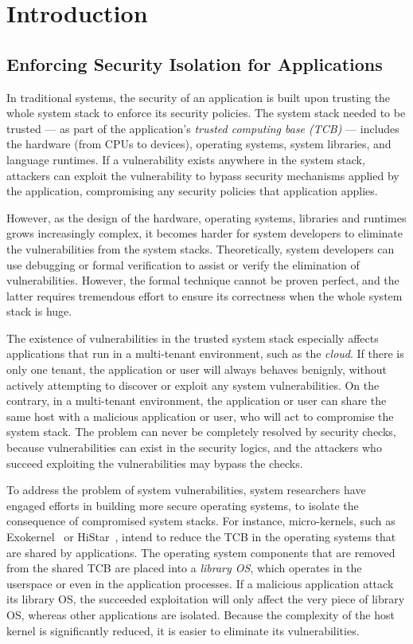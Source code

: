 \chapter{Introduction}
\label{chap:intro}

\section{Enforcing Security Isolation for Applications}
\label{sec:intro:isolation}

In traditional systems, the security of an application is built upon
trusting the whole system stack to enforce its security policies.
The system stack needed to be trusted
--- as part of the application's {\em trusted computing base (TCB)}
--- includes the hardware (from CPUs to devices), operating systems, system libraries, and language runtimes.
If a vulnerability exists anywhere in the system stack,
attackers can exploit the vulnerability to bypass security mechanisms applied by the application,
compromising any security policies that application applies.

However, as the design of the hardware, operating systems, libraries and runtimes grows increasingly complex,
it becomes harder for system developers to eliminate the vulnerabilities
from the system stacks.
Theoretically, system developers can use debugging or formal verification
to assist or verify the elimination of vulnerabilities.
However, the formal technique cannot be proven perfect, and the latter requires tremendous effort to ensure its correctness
when the whole system stack is huge.

The existence of vulnerabilities in the trusted system stack especially affects applications that run in a multi-tenant environment, such as the {\em cloud}.
If there is only one tenant,
the application or user will always behaves benignly,
without actively attempting to discover or exploit any system vulnerabilities.
On the contrary, in a multi-tenant environment,
the application or user can share the same host with a malicious application or user,
who will act to compromise the system stack.
The problem can never be completely resolved by security checks,
because vulnerabilities can exist in the security logics,
and the attackers who succeed exploiting the vulnerabilities may bypass the checks.

To address the problem of system vulnerabilities, system researchers have engaged efforts in building more secure operating systems,
to isolate the consequence of compromised system stacks.
For instance,
micro-kernels, such as Exokernel~\citep{engler95exokernel} or HiStar~\citep{zeldovich+histar},
intend to reduce the TCB in the operating systems that are shared by applications.
The operating system components that are removed from the shared TCB are placed into a {\em library OS}, which operates in the userspace or even in the application processes.
If a malicious application attack its library OS,
the succeeded exploitation will only affect the very piece of library OS,
whereas other applications are isolated.
Because the complexity of the host kernel is significantly reduced,
it is easier to eliminate its vulnerabilities.

